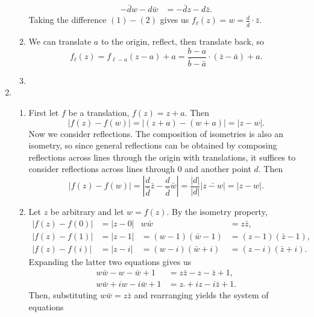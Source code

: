 \begin{enumerate}
\begin{enumerate}
\begin{align*}
-\bar{d}w - d\bar{w} &= -\bar{d}z - d\bar{z}. \tag{2}
\end{align*}
Taking the difference $(1) - (2)$ gives us $f_{\ell}(z) = w = \frac{d}{\bar{d}}\cdot\bar{z}$.
\item We can translate $a$ to the origin, reflect, then translate back, so 
\begin{equation*}
f_{\ell}(z) = f_{\ell - a}(z - a) + a = \frac{b - a}{\bar{b} - \bar{a}}\cdot(\bar{z} - \bar{a}) + a.
\end{equation*}
\item 
\end{enumerate}
\item \begin{enumerate}
\item First let $f$ be a translation, $f(z) = z + a$. Then
\begin{equation*}
\lvert f(z) - f(w)\rvert = \lvert (z + a) - (w + a)\rvert = \lvert z - w\rvert.
\end{equation*}
Now we consider reflections. The composition of isometries is also an isometry, so since general reflections can be obtained by composing reflections across lines through the origin with translations, it suffices to consider reflections across lines through $0$ and another point $d$. Then
\begin{equation*}
\lvert f(z) - f(w)\rvert = \left\lvert\frac{d}{\bar{d}}\bar{z} - \frac{d}{\bar{d}}\bar{w}\right\rvert = \frac{\lvert d\rvert}{\lvert d\rvert}\lvert\bar{z - w}\rvert = \lvert z - w\rvert.
\end{equation*}
\item Let $z$ be arbitrary and let $w = f(z)$. By the isometry property,
\begin{align*}
\lvert f(z) - f(0)\rvert &= \lvert z - 0\rvert & w\bar{w} &= z\bar{z}, \\
\lvert f(z) - f(1)\rvert &= \lvert z - 1\rvert &= (w - 1)(\bar{w} - 1) &= (z - 1)(\bar{z} - 1), \\
\lvert f(z) - f(i)\rvert &= \lvert z - i\rvert &= (w - i)(\bar{w} + i) &= (z - i)(\bar{z} + i).
\end{align*}
Expanding the latter two equations gives us
\begin{align*}
w\bar{w} - w - \bar{w} + 1 &= z\bar{z} - z - \bar{z} + 1, \\
w\bar{w} + iw - i\bar{w} + 1 &= z\bar{} + iz - i\bar{z} + 1.
\end{align*}
Then, substituting $w\bar{w} = z\bar{z}$ and rearranging yields the system of equations
\begin{align*}

\end{align*}
\end{enumerate}
\end{enumerate}
